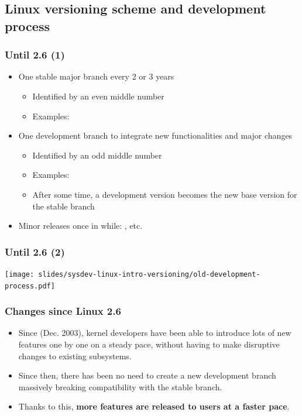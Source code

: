 \subsection{Linux versioning scheme and development process}

\begin{frame}
  \frametitle{Until 2.6 (1)}
  \begin{itemize}
  \item One stable major branch every 2 or 3 years
    \begin{itemize}
    \item Identified by an even middle number
    \item Examples: 
    \end{itemize}
  \item One development branch to integrate new functionalities and
    major changes
    \begin{itemize}
    \item Identified by an odd middle number
    \item Examples: 
    \item After some time, a development version becomes the new base
      version for the stable branch
    \end{itemize}
  \item Minor releases once in while: , etc.
  \end{itemize}
\end{frame}

\begin{frame}
  \frametitle{Until 2.6 (2)}
  \begin{center}
    \texttt{[image: slides/sysdev-linux-intro-versioning/old-development-process.pdf]}
  \end{center} \end{frame}

\begin{frame}
  \frametitle{Changes since Linux 2.6}
  \begin{itemize}
  \item Since  (Dec. 2003), kernel developers have been able to
    introduce lots of new features one by one on a steady pace,
    without having to make disruptive changes to existing subsystems.
  \item Since then, there has been no need to create a new development branch
    massively breaking compatibility with the stable branch.
  \item Thanks to this, {\bf more features are released to users at a
      faster pace}.
  \end{itemize}
\end{frame}

